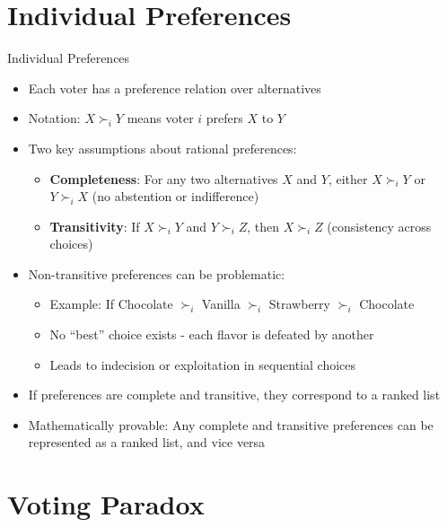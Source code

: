 \documentclass[10pt,handout]{beamer}
\begin{document}
\section{Individual Preferences}

\begin{frame}{Individual Preferences}
  \begin{itemize}[<+->]
    \item Each voter has a preference relation over alternatives
    \item Notation: $X \succ_i Y$ means voter $i$ prefers $X$ to $Y$ 
    \item Two key assumptions about rational preferences:
      \begin{itemize}
        \item \textbf{Completeness}: For any two alternatives $X$ and $Y$, either $X \succ_i Y$ or $Y \succ_i X$ (no abstention or indifference)
        \item \textbf{Transitivity}: If $X \succ_i Y$ and $Y \succ_i Z$, then $X \succ_i Z$ (consistency across choices)
      \end{itemize}
    \item Non-transitive preferences can be problematic:
      \begin{itemize}
        \item Example: If Chocolate $\succ_i$ Vanilla $\succ_i$ Strawberry $\succ_i$ Chocolate
        \item No ``best'' choice exists - each flavor is defeated by another
        \item Leads to indecision or exploitation in sequential choices
      \end{itemize}
    \item If preferences are complete and transitive, they correspond to a ranked list
    \item Mathematically provable: Any complete and transitive preferences can be represented as a ranked list, and vice versa
  \end{itemize}
\end{frame}

\section{Voting Paradox}
\end{document}
